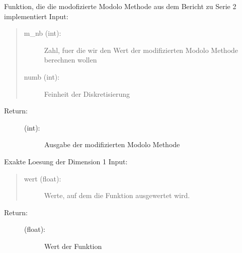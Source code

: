 \documentclass[letterpaper,10pt,ngerman]{sphinxmanual}
\begin{document}
\begin{fulllineitems}
\label{\detokenize{index:aufg_5_2.modo}}
Funktion, die die modofizierte Modolo Methode aus dem Bericht zu Serie 2 implementiert
Input:
\begin{quote}
\begin{description}
\item[{m\_nb (int):}] \leavevmode
Zahl, fuer die wir den Wert der modifizierten Modolo Methode berechnen wollen

\item[{numb (int):}] \leavevmode
Feinheit der Diskretisierung

\end{description}
\end{quote}
\begin{description}
\item[{Return:}] \leavevmode\begin{description}
\item[{(int):}] \leavevmode
Ausgabe der modifizierten Modolo Methode

\end{description}

\end{description}

\end{fulllineitems}


\begin{fulllineitems}
\label{\detokenize{index:aufg_5_2.ulsg1}}
Exakte Loesung der Dimension 1
Input:
\begin{quote}
\begin{description}
\item[{wert (float):}] \leavevmode
Werte, auf dem die Funktion ausgewertet wird.

\end{description}
\end{quote}
\begin{description}
\item[{Return:}] \leavevmode\begin{description}
\item[{(float):}] \leavevmode
Wert der Funktion

\end{description}

\end{description}

\end{fulllineitems}
\end{document}
